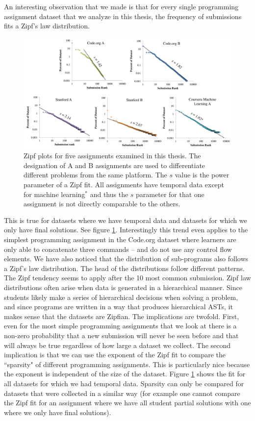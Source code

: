 An interesting observation that we made is that for every single programming assignment dataset that we analyze in this thesis, the frequency of submissions fits a Zipf's law distribution. 
\begin{figure}[ht]
\center
\includegraphics[width=1.0\textwidth]{img/zipfAll}
\caption[Submission Sparcity]{
Zipf plots for five assignments examined in this thesis. The designation of A and B assignments are used to differentiate different problems from the same platform. The $s$ value is the power parameter of a Zipf fit. All assignments have temporal data except for machine learning$^*$ and thus the $s$ parameter for that one assignment is not directly comparable to the others.
}
\label{fig:zipfAll}
\end{figure}
This is true for datasets where we have temporal data and datasets for which we only have final solutions. See figure \ref{fig:zipfAll}. Interestingly this trend even applies to the simplest programming assignment in the Code.org dataset where learners are only able to concatenate three commands -- and do not use any control flow elements. We have also noticed that the distribution of sub-programs also follows a Zipf's law distribution. The head of the distributions follow different patterns. The Zipf tendency seems to apply after the 10 most common submission. Zipf law distributions often arise when data is generated in a hierarchical manner. Since students likely make a series of hierarchical decisions when solving a problem, and since programs are written in a way that produces hierarchical ASTs, it makes sense that the datasets are Zipfian. The implications are twofold. First, even for the most simple programming assignments that we look at there is a non-zero probability that a new submission will never be seen before and that will always be true regardless of how large a dataset we collect. The second implication is that we can use the exponent of the Zipf fit to compare the ``sparsity" of different programming assignments. This is particularly nice because the exponent is independent of the size of the dataset. Figure \ref{fig:zipfAll} shows the fit for all datasets for which we had temporal data. Sparsity can only be compared for datasets that were collected in a similar way (for example one cannot compare the Zipf fit for an assignment where we have all student partial solutions with one where we only have final solutions).

